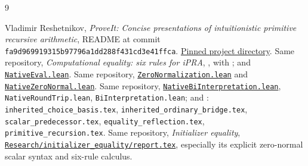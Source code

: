 \documentclass[11pt]{article}
\theoremstyle{definition}\newtheorem{definition}[theorem]{Definition}
\begin{document}
\clearpage
\begin{thebibliography}{9}
\raggedright
{} Vladimir Reshetnikov, \emph{ProveIt: Concise presentations
of intuitionistic primitive recursive arithmetic}, README at commit
\texttt{fa9d969919315b97796a1dd288f431cd3e41ffca}.
\href{https://github.com/VladimirReshetnikov/ProveIt/tree/fa9d969919315b97796a1dd288f431cd3e41ffca/Logic/PrimitiveRecursiveArithmetic/ConciseIPRA}{Pinned project directory}.
 Same repository, \emph{Computational equality: six rules
for iPRA}, , with
; and
\href{https://github.com/VladimirReshetnikov/ProveIt/blob/fa9d969919315b97796a1dd288f431cd3e41ffca/Logic/PrimitiveRecursiveArithmetic/ConciseIPRA/Lean/ConciseIPRA/NativeEval.lean}{\texttt{NativeEval.lean}}.
 Same repository,
\href{https://github.com/VladimirReshetnikov/ProveIt/blob/fa9d969919315b97796a1dd288f431cd3e41ffca/Logic/PrimitiveRecursiveArithmetic/ConciseIPRA/Lean/ConciseIPRA/ZeroNormalization.lean}{\texttt{ZeroNormalization.lean}}
and
\href{https://github.com/VladimirReshetnikov/ProveIt/blob/fa9d969919315b97796a1dd288f431cd3e41ffca/Logic/PrimitiveRecursiveArithmetic/ConciseIPRA/Lean/ConciseIPRA/NativeZeroNormal.lean}{\texttt{NativeZeroNormal.lean}}.
 Same repository,
\href{https://github.com/VladimirReshetnikov/ProveIt/blob/fa9d969919315b97796a1dd288f431cd3e41ffca/Logic/PrimitiveRecursiveArithmetic/ConciseIPRA/Lean/ConciseIPRA/NativeBiInterpretation.lean}{\texttt{NativeBiInterpretation.lean}},
\texttt{NativeRoundTrip.lean}, \texttt{BiInterpretation.lean}; and
:
\texttt{inherited\_choice\_basis.tex},
\texttt{inherited\_ordinary\_bridge.tex},
\texttt{scalar\_predecessor.tex},
\texttt{equality\_reflection.tex},
\texttt{primitive\_recursion.tex}.
 Same repository,
\emph{Initializer equality},
\href{https://github.com/VladimirReshetnikov/ProveIt/blob/fa9d969919315b97796a1dd288f431cd3e41ffca/Logic/PrimitiveRecursiveArithmetic/ConciseIPRA/Research/initializer_equality/report.tex}{\texttt{Research/initializer\_equality/report.tex}},
especially its explicit zero-normal scalar syntax and six-rule calculus.
\end{thebibliography}
\end{document}
